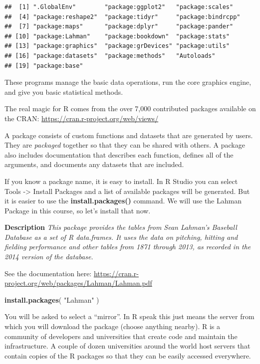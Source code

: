 \documentclass[]{book}
\newenvironment{Shaded}{\begin{snugshade}}{\end{snugshade}}
\newcommand{\KeywordTok}[1]{\textcolor[rgb]{0.13,0.29,0.53}{\textbf{#1}}}
\newcommand{\NormalTok}[1]{#1}
\newcommand{\StringTok}[1]{\textcolor[rgb]{0.31,0.60,0.02}{#1}}
\theoremstyle{definition}
\theoremstyle{definition}
\theoremstyle{definition}
\theoremstyle{remark}
\begin{document}
\begin{verbatim}
##  [1] ".GlobalEnv"        "package:ggplot2"   "package:scales"   
##  [4] "package:reshape2"  "package:tidyr"     "package:bindrcpp" 
##  [7] "package:maps"      "package:dplyr"     "package:pander"   
## [10] "package:Lahman"    "package:bookdown"  "package:stats"    
## [13] "package:graphics"  "package:grDevices" "package:utils"    
## [16] "package:datasets"  "package:methods"   "Autoloads"        
## [19] "package:base"
\end{verbatim}

These programs manage the basic data operations, run the core graphics
engine, and give you basic statistical methods.

The real magic for R comes from the over 7,000 contributed packages
available on the CRAN: \url{https://cran.r-project.org/web/views/}

A package consists of custom functions and datasets that are generated
by users. They are \emph{packaged} together so that they can be shared
with others. A package also includes documentation that describes each
function, defines all of the arguments, and documents any datasets that
are included.

If you know a package name, it is easy to install. In R Studio you can
select Tools -\textgreater{} Install Packages and a list of available
packages will be generated. But it is easier to use the
\textbf{install.packages()} command. We will use the Lahman Package in
this course, so let's install that now.

\textbf{Description} \emph{This package provides the tables from Sean
Lahman's Baseball Database as a set of R data.frames. It uses the data
on pitching, hitting and fielding performance and other tables from 1871
through 2013, as recorded in the 2014 version of the database.}

See the documentation here:
\url{https://cran.r-project.org/web/packages/Lahman/Lahman.pdf}

\begin{Shaded}
\begin{Highlighting}[]
\KeywordTok{install.packages}\NormalTok{( }\StringTok{"Lahman"}\NormalTok{ )}
\end{Highlighting}
\end{Shaded}

You will be asked to select a ``mirror''. In R speak this just means the
server from which you will download the package (choose anything
nearby). R is a community of developers and universities that create
code and maintain the infrastructure. A couple of dozen universities
around the world host servers that contain copies of the R packages so
that they can be easily accessed everywhere.
\end{document}
